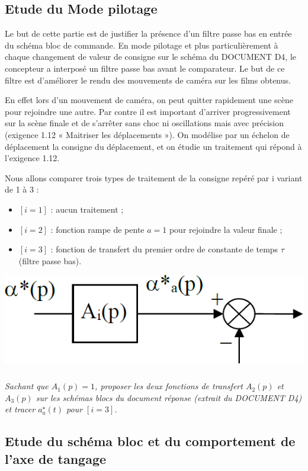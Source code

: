 \documentclass[10pt,fleqn]{article} %
\begin{document}
\subsection{Etude du Mode pilotage}

Le but de cette partie est de justifier la présence d’un filtre passe bas en entrée du schéma bloc de commande.
En mode pilotage et plus particulièrement à chaque changement de valeur de consigne sur le schéma du DOCUMENT D4, le concepteur a interposé un filtre passe bas avant le comparateur. Le but de ce filtre est d’améliorer le rendu des mouvements de caméra sur les films obtenus.

En effet lors d’un mouvement de caméra, on peut quitter rapidement une scène pour rejoindre une autre. Par contre il est important d’arriver progressivement sur la scène finale et de s’arrêter sans choc ni oscillations mais avec précision (exigence 1.12 « Maitriser les déplacements »).
On modélise par un échelon de déplacement la consigne du déplacement, et on étudie un traitement qui répond à l’exigence 1.12. 

Nous allons comparer trois types de traitement de la consigne repéré par i variant de 1 à 3 :
\begin{itemize}
\item $[i=1]$ : aucun traitement ;
\item $[i=2]$ : fonction rampe de pente $a = 1$ pour rejoindre la valeur finale ;
\item $[i=3]$ : fonction de transfert du premier ordre de constante de temps $\tau$ (filtre passe bas).
\end{itemize}

\begin{center}
\includegraphics[width=.25\linewidth]{fig_b}
\end{center}

\subparagraph{\label{q21}}\textit{Sachant que  $A_1(p) = 1$, proposer les deux fonctions de transfert $A_2(p)$ et $A_3(p)$ sur les schémas blocs du document réponse (extrait du DOCUMENT D4) et tracer $a^{\star}_a(t)$ pour $[i=3]$.} 

\subsection{Etude du schéma bloc et du comportement de l’axe de tangage}
\end{document}
